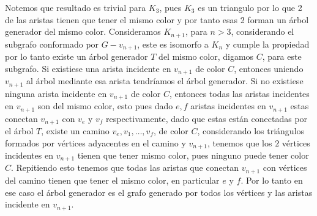 \documentclass[a4paper,oneside,10.5pt]{USMArt}
\begin{document}
\begin{sol}
  Notemos que resultado es trivial para $K_{3}$, pues $K_{3}$ es un triangulo por lo que 2 de las aristas tienen
  que tener el mismo color y por tanto esas 2 forman un árbol generador del mismo color. Consideramos $K_{n + 1}$, para
  $n > 3$, considerando el subgrafo conformado por $G - v_{n + 1}$, este es isomorfo a $K_{n}$ y cumple la propiedad
  por lo tanto existe un árbol generador $T$ del mismo color, digamos $C$, para este subgrafo. Si existiese una arista
  incidente en $v_{n + 1}$ de color $C$, entonces uniendo $v_{n + 1}$ al árbol mediante esa arista tendríamos el árbol
  generador. Si no existiese ninguna arista incidente en $v_{n + 1}$ de color $C$, entonces todas las aristas incidentes
  en $v_{n + 1}$ son del mismo color, esto pues dado $e, f$ aristas incidentes en $v_{n + 1}$ estas conectan
  $v_{n + 1}$ con $v_{e}$ y $v_{f}$ respectivamente, dado que estas están conectadas por el árbol $T$, existe un camino
  $v_{e}, v_{1}, \dots, v_{f}$, de color $C$, considerando los triángulos formados por vértices
  adyacentes en el camino y $v_{n + 1}$, tenemos que los $2$ vértices incidentes en $v_{n + 1}$ tienen que tener mismo
  color, pues ninguno puede tener color $C$. Repitiendo esto tenemos que todas las aristas que conectan $v_{n + 1}$
  con vértices del camino tienen que tener el mismo color, en particular $e$ y $f$. Por lo tanto en ese caso
  el árbol generador es el grafo generado por todos los vértices y las aristas incidente en $v_{n + 1}$.
\end{sol}
\end{document}

